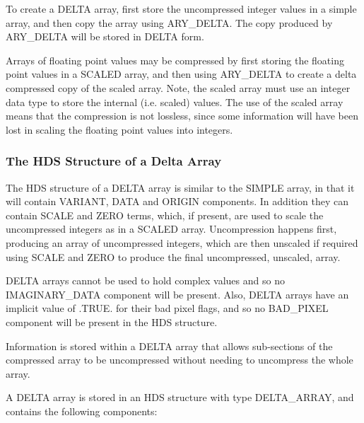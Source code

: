 \documentclass[twoside,11pt]{article}
\begin{document}
To create a DELTA array, first store the uncompressed integer values in a
simple array, and then copy the array using ARY\_DELTA. The copy produced
by ARY\_DELTA will be stored in DELTA form.

Arrays of floating point values may be compressed by first storing the
floating point values in a SCALED array, and then using ARY\_DELTA to
create a delta compressed copy of the scaled array. Note, the scaled
array must use an integer data type to store the internal (i.e. scaled)
values. The use of the scaled array means that the compression is not
lossless, since some information will have been lost in scaling the
floating point values into integers.

\subsubsection{The HDS Structure of a Delta Array}
The HDS structure of a DELTA array is similar to the SIMPLE array,
in that it will contain VARIANT, DATA and ORIGIN components. In
addition they can contain SCALE and ZERO terms, which, if present,
are used to scale the uncompressed integers as in a SCALED array.
Uncompression happens first, producing an array of uncompressed
integers, which are then unscaled if required using SCALE and ZERO to
produce the final uncompressed, unscaled, array.

DELTA arrays cannot be used to hold complex values and so no
IMAGINARY\_DATA component will be present. Also, DELTA arrays have an
implicit value of .TRUE. for their bad pixel flags, and so no BAD\_PIXEL
component will be present in the HDS structure.

Information is stored within a DELTA array that allows sub-sections of
the compressed array to be uncompressed without needing to uncompress the
whole array.

A DELTA array is stored in an HDS structure with type DELTA\_ARRAY, and
contains the following components:
\end{document}
